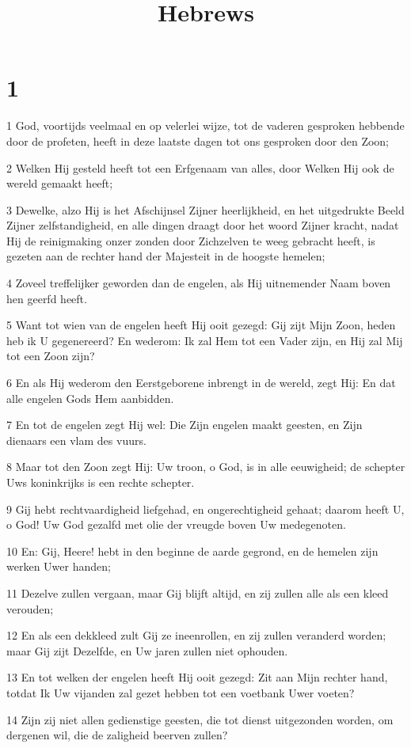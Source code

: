 

\title{Hebrews}



\chapter{1}

\par 1 God, voortijds veelmaal en op velerlei wijze, tot de vaderen gesproken hebbende door de profeten, heeft in deze laatste dagen tot ons gesproken door den Zoon;
\par 2 Welken Hij gesteld heeft tot een Erfgenaam van alles, door Welken Hij ook de wereld gemaakt heeft;
\par 3 Dewelke, alzo Hij is het Afschijnsel Zijner heerlijkheid, en het uitgedrukte Beeld Zijner zelfstandigheid, en alle dingen draagt door het woord Zijner kracht, nadat Hij de reinigmaking onzer zonden door Zichzelven te weeg gebracht heeft, is gezeten aan de rechter hand der Majesteit in de hoogste hemelen;
\par 4 Zoveel treffelijker geworden dan de engelen, als Hij uitnemender Naam boven hen geerfd heeft.
\par 5 Want tot wien van de engelen heeft Hij ooit gezegd: Gij zijt Mijn Zoon, heden heb ik U gegenereerd? En wederom: Ik zal Hem tot een Vader zijn, en Hij zal Mij tot een Zoon zijn?
\par 6 En als Hij wederom den Eerstgeborene inbrengt in de wereld, zegt Hij: En dat alle engelen Gods Hem aanbidden.
\par 7 En tot de engelen zegt Hij wel: Die Zijn engelen maakt geesten, en Zijn dienaars een vlam des vuurs.
\par 8 Maar tot den Zoon zegt Hij: Uw troon, o God, is in alle eeuwigheid; de schepter Uws koninkrijks is een rechte schepter.
\par 9 Gij hebt rechtvaardigheid liefgehad, en ongerechtigheid gehaat; daarom heeft U, o God! Uw God gezalfd met olie der vreugde boven Uw medegenoten.
\par 10 En: Gij, Heere! hebt in den beginne de aarde gegrond, en de hemelen zijn werken Uwer handen;
\par 11 Dezelve zullen vergaan, maar Gij blijft altijd, en zij zullen alle als een kleed verouden;
\par 12 En als een dekkleed zult Gij ze ineenrollen, en zij zullen veranderd worden; maar Gij zijt Dezelfde, en Uw jaren zullen niet ophouden.
\par 13 En tot welken der engelen heeft Hij ooit gezegd: Zit aan Mijn rechter hand, totdat Ik Uw vijanden zal gezet hebben tot een voetbank Uwer voeten?
\par 14 Zijn zij niet allen gedienstige geesten, die tot dienst uitgezonden worden, om dergenen wil, die de zaligheid beerven zullen?

